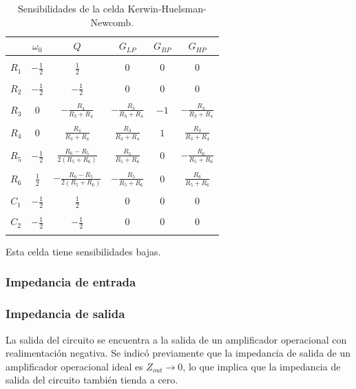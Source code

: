 \begin{table}[H]
	\centering
	\begin{tabular}{c c c c c c}
		  & $\omega_0$ & $Q$ &$G_{LP}$ & $G_{BP}$& $G_{HP}$\\
		\hline \\
	$R_1$ & $-\frac{1}{2}$& $\frac{1}{2}$ & $0$& $0$&$0$\\ \\
	$R_2$ & $-\frac{1}{2}$& $-\frac{1}{2}$ & $0$& $0$& $0$\\ \\
	$R_3$ & $0$& $-\frac{R_4}{R_3+R_4}$ & $-\frac{R_3}{R_3+R_4}$&$-1$ & $-\frac{R_3}{R_3+R_4}$\\ \\
	$R_4$ & $0$& $\frac{R_4}{R_3+R_4}$& $\frac{R_3}{R_3+R_4}$ &$1$ & $\frac{R_3}{R_3+R_4}$\\ \\
	$R_5$ & $-\frac{1}{2}$&$\frac{R_6-R_5}{2(R_5+R_6)}$ & $\frac{R_5}{R_5+R_6}$&$0$ & $-\frac{R_6}{R_5+R_6}$\\ \\
	$R_6$ & $\frac{1}{2}$& $-\frac{R_6-R_5}{2(R_5+R_6)}$ & $-\frac{R_5}{R_5+R_6}$& $0$&$\frac{R_6}{R_5+R_6}$ \\ \\
	$C_1$ & $-\frac{1}{2}$& $\frac{1}{2}$ & $0$& $0$&$0$ \\ \\
	$C_2$ & $-\frac{1}{2}$& $-\frac{1}{2}$ & $0$ & $0$&$0$\\ \\
		\hline
	\end{tabular}
	\caption{Sensibilidades de la celda Kerwin-Huelsman-Newcomb.}
	\label{sens_k}
\end{table}


Esta celda tiene sensibilidades bajas.

\subsubsection{Impedancia de entrada}


\subsubsection{Impedancia de salida}
La salida del circuito se encuentra a la salida de un amplificador operacional con realimentaci\'on negativa.  Se indic\'o previamente que la impedancia de salida de un amplificador operacional ideal es $Z_{out} \to 0$, lo que implica que la impedancia de salida del circuito tambi\'en tienda a cero.

